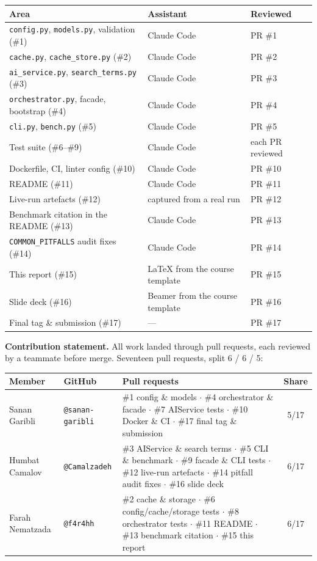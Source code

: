 \documentclass[11pt,a4paper]{article}
\begin{document}
\begin{center}\small
\begin{tabularx}{\textwidth}{@{}lXl@{}}
\toprule
\textbf{Area} & \textbf{Assistant} & \textbf{Reviewed} \\
\midrule
\texttt{config.py}, \texttt{models.py}, validation (\#1) & Claude Code & PR \#1 \\
\texttt{cache.py}, \texttt{cache\_store.py} (\#2) & Claude Code & PR \#2 \\
\texttt{ai\_service.py}, \texttt{search\_terms.py} (\#3) & Claude Code & PR \#3 \\
\texttt{orchestrator.py}, facade, bootstrap (\#4) & Claude Code & PR \#4 \\
\texttt{cli.py}, \texttt{bench.py} (\#5) & Claude Code & PR \#5 \\
Test suite (\#6--\#9) & Claude Code & each PR reviewed \\
Dockerfile, CI, linter config (\#10) & Claude Code & PR \#10 \\
README (\#11) & Claude Code & PR \#11 \\
Live-run artefacts (\#12) & captured from a real run & PR \#12 \\
Benchmark citation in the README (\#13) & Claude Code & PR \#13 \\
\texttt{COMMON\_PITFALLS} audit fixes (\#14) & Claude Code & PR \#14 \\
This report (\#15) & LaTeX from the course template & PR \#15 \\
Slide deck (\#16) & Beamer from the course template & PR \#16 \\
Final tag \& submission (\#17) & --- & PR \#17 \\
\bottomrule
\end{tabularx}
\end{center}

\vspace{0.6em}
\textbf{Contribution statement.} All work landed through pull requests, each reviewed by a teammate
before merge. Seventeen pull requests, split 6 / 6 / 5:

\begin{center}\small
\begin{tabularx}{\textwidth}{@{}llXc@{}}
\toprule
\textbf{Member} & \textbf{GitHub} & \textbf{Pull requests} & \textbf{Share} \\
\midrule
Sanan Garibli & \texttt{@sanan-garibli} & \#1 config \& models $\cdot$ \#4 orchestrator \& facade $\cdot$ \#7 AIService tests $\cdot$ \#10 Docker \& CI $\cdot$ \#17 final tag \& submission & 5/17 \\
\addlinespace
Humbat Camalov & \texttt{@Camalzadeh} & \#3 AIService \& search terms $\cdot$ \#5 CLI \& benchmark $\cdot$ \#9 facade \& CLI tests $\cdot$ \#12 live-run artefacts $\cdot$ \#14 pitfall audit fixes $\cdot$ \#16 slide deck & 6/17 \\
\addlinespace
Farah Nematzada & \texttt{@f4r4hh} & \#2 cache \& storage $\cdot$ \#6 config/cache/storage tests $\cdot$ \#8 orchestrator tests $\cdot$ \#11 README $\cdot$ \#13 benchmark citation $\cdot$ \#15 this report & 6/17 \\
\bottomrule
\end{tabularx}
\end{center}
\end{document}
